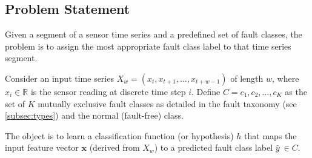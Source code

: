 
\subsection{Problem Statement}
Given a segment of a sensor time series and a predefined set of fault classes, the problem is to assign the most appropriate fault class label to that time series segment.

Consider an input time series \(X_w = (x_t, x_{t+1}, \ldots, x_{t+w-1})\) of length \(w\), where \(x_i \in \mathbb{R}\) is the sensor reading at discrete time step \(i\). Define \(C = {c_1, c_2, \ldots, c_K}\) as the set of \(K\) mutually exclusive fault classes as detailed in the fault taxonomy (see \ref{subsec:types}) and the normal (fault-free) class.

The object is to learn a classification function (or hypothesis) \(h\) that maps the input feature vector \(\mathbf{x}\) (derived from \(X_w\)) to a predicted fault class label \(\hat{y}\ \in C\).
